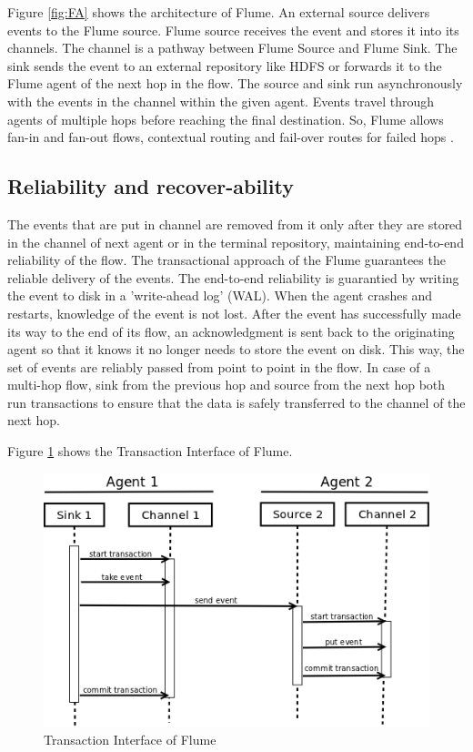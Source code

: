 \documentclass[9pt,twocolumn,twoside]{styles/osajnl}
\begin{document}
Figure \ref{fig:FA} shows the architecture of Flume. An external source delivers events to the Flume source. Flume source receives the event and stores it into its channels. The channel is a pathway between Flume Source and Flume Sink. The sink sends the event to an external repository like HDFS or forwards it to the Flume agent of the next hop in the flow. The source and sink run asynchronously with the events in the channel within the given agent. Events travel through agents of multiple hops before reaching the final destination.
So, Flume allows fan-in and fan-out flows, contextual routing and fail-over routes for failed hops  \cite{cloudera}.

\subsection{Reliability and recover-ability}

The events that are put in channel are removed from it only after they are stored in the channel of next agent or in the terminal repository, maintaining end-to-end reliability of the flow. The transactional approach of the Flume guarantees the reliable delivery of the events.
The end-to-end reliability is guarantied by writing the event to disk in a 'write-ahead log' (WAL). When the agent crashes and restarts, knowledge of the event is not lost. After the event has successfully made its way to the end of its flow, an acknowledgment is sent back to the originating agent so that it knows it no longer needs to store the event on disk. This way, the set of events are reliably passed from point to point in the flow. In case of a multi-hop flow, sink from the previous hop and source from the next hop both run transactions to ensure that the data is safely transferred to the channel of the next hop.

Figure \ref{fig:TI} shows the Transaction Interface of Flume.
\begin{figure}[htbp]
\centering
\includegraphics[width=\linewidth]{images/Flume_TI.png}
\caption{Transaction Interface of Flume \cite{dev-manual}}
\label{fig:TI}
\end{figure}
\end{document}
